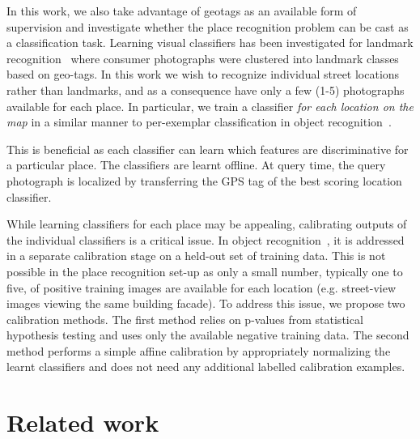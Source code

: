   In this work, we also take advantage of geotags as an available form of supervision and investigate whether the place recognition problem can be cast as a classification task.
 \textcolor{petr}{
    Learning visual classifiers has been investigated for landmark recognition~\cite{Li09} where consumer photographs were clustered into landmark classes based on geo-tags. 
  In this work we wish to recognize individual street locations rather than landmarks, and as a consequence have only a few (1-5) photographs available for each place.  In particular, we train a classifier {\em for each location on the map} in a similar manner to per-exemplar classification in object recognition~\cite{Malisiewicz11}. 
}


  This is beneficial as  each classifier can learn which features are discriminative for a particular place. %
   The classifiers are learnt offline. At query time, the query photograph is localized by transferring the GPS tag of the best scoring location classifier.

  While learning classifiers for each place may be appealing, calibrating outputs of the individual classifiers is a critical issue. In object recognition~\cite{Malisiewicz11}, it is addressed in a separate calibration stage on a held-out set of training data.
  This is not possible in the place recognition set-up as only a small number, typically one to five, of positive training images are available for each location (e.g. street-view images viewing the same building facade). To address this issue, we propose two calibration methods. 
  The first method relies on p-values from statistical hypothesis testing and uses only the available negative training data. The second method performs a simple affine calibration by appropriately normalizing the learnt classifiers and does not need any additional labelled calibration examples.   



\section{Related work} 
\label{sec:related}

